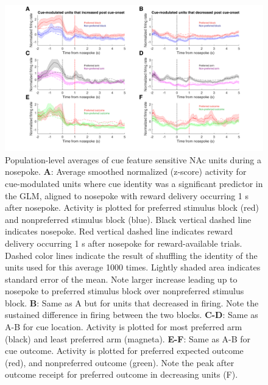 \documentclass[11pt]{article}
\newcommand{\bsf}[1]{\textbf{#1}}
\begin{document}
 \begin{figure}[ht!]
\centering
\includegraphics[width=\textwidth]{Fig 11 - NP population averages.pdf}
\caption{Population-level averages of cue feature sensitive NAc units during a
  nosepoke. \bsf{A}: Average smoothed normalized (z-score) activity for cue-modulated
  units where cue identity was a significant predictor in the GLM, aligned to
  nosepoke with reward delivery occurring 1 s after nosepoke. Activity is
  plotted for preferred stimulus block (red) and nonpreferred stimulus block
  (blue). Black vertical dashed line indicates nosepoke. Red vertical dashed line indicates reward
  delivery occurring 1 s after nosepoke for reward-available trials. Dashed color lines indicate the result of shuffling the identity of the units used for this average 1000 times. Lightly
  shaded area indicates standard error of the mean. Note larger increase leading
  up to nosepoke to preferred stimulus block over nonpreferred stimulus
  block. \bsf{B}: Same as A but for units that decreased in firing. Note the
  sustained difference in firing between the two blocks. \bsf{C-D}: Same as A-B
  for cue location. Activity is plotted for most preferred arm (black) and least preferred arm (magneta). \bsf{E-F}: Same as A-B for cue outcome. Activity is plotted for
  preferred expected outcome (red), and nonpreferred outcome (green). Note the
  peak after outcome receipt for preferred outcome in decreasing units (F).}
\label{fig:NP_pop}
\end{figure} \clearpage
\end{document}
